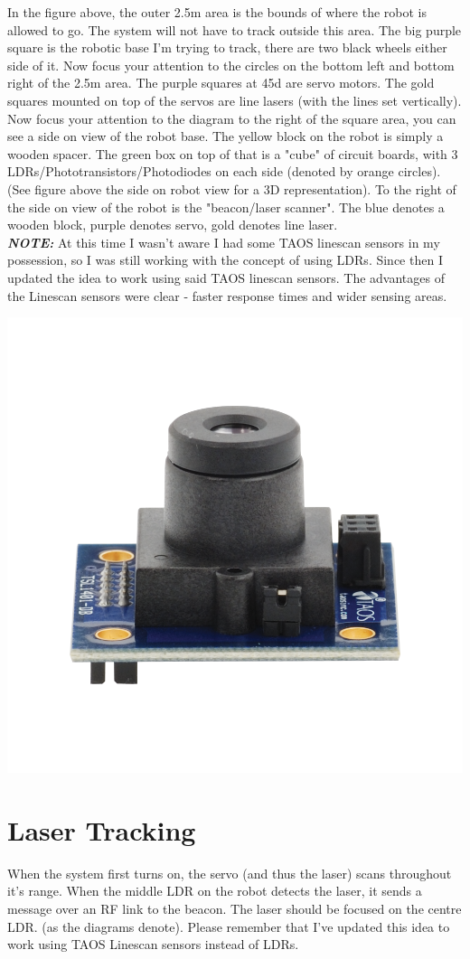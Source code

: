				In the figure above, the outer 2.5m area is the bounds of where the robot is allowed to go. The system will not have to track outside this area. The big purple square is the robotic base I'm trying to track, there are two black wheels either side of it. Now focus your attention to the circles on the bottom left and bottom right of the 2.5m area. The purple squares at 45d are servo motors. The gold squares mounted on top of the servos are line lasers (with the lines set vertically).\\
				
				Now focus your attention to the diagram to the right of the square area, you can see a side on view of the robot base. The yellow block on the robot is simply a wooden spacer. The green box on top of that is a "cube" of circuit boards, with 3 LDRs/Phototransistors/Photodiodes on each side (denoted by orange circles). (See figure above the side on robot view for a 3D representation). To the right of the side on view of the robot is the "beacon/laser scanner". The blue denotes a wooden block, purple denotes servo, gold denotes line laser.\\
				
				\textbf{\textit{NOTE: }}At this time I wasn't aware I had some TAOS linescan sensors in my possession, so I was still working with the concept of using LDRs. Since then I updated the idea to work using said TAOS linescan sensors. The advantages of the Linescan sensors were clear - faster response times and wider sensing areas.
				
				\centerline{\includegraphics[width=0.5\linewidth]{images/linescan_sensor}}
				
			\section{Laser Tracking}		
				When the system first turns on, the servo (and thus the laser) scans throughout it's range. When the middle LDR on the robot detects the laser, it sends a message over an RF link to the beacon. The laser should be focused on the centre LDR. (as the diagrams denote). Please remember that I've updated this idea to work using TAOS Linescan sensors instead of LDRs.
				
